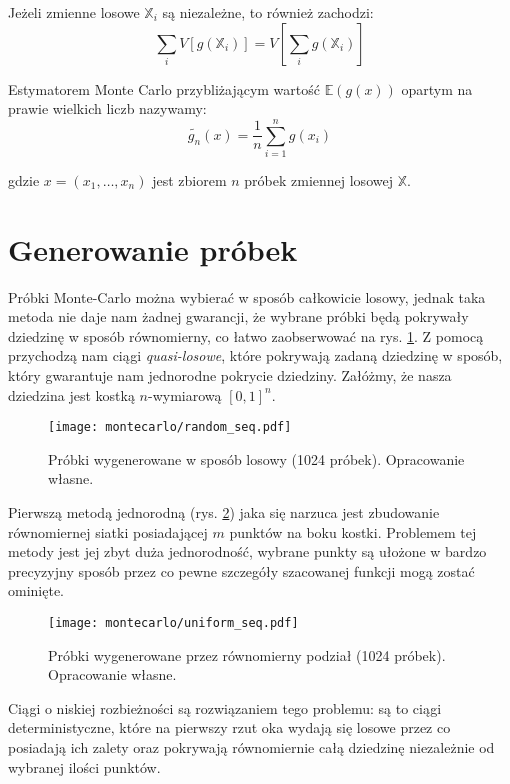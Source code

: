 \documentclass[../main.tex]{subfiles}
\begin{document}
Jeżeli zmienne losowe $\mathbb{X}_i$ są niezależne, to również zachodzi:
\[
\sum_{i} V \left[
	g(\mathbb{X}_i)
\right]
=
V \left[
	\sum_{i} g(\mathbb{X}_i)
\right]
\]

Estymatorem Monte Carlo przybliżającym wartość $\mathbb{E}(g(x))$ opartym na prawie wielkich liczb nazywamy:
\[
\widetilde{g_n}(x) =
	\frac{1}{n}
	\sum_{i=1}^{n}g(x_i)
\]

\noindent gdzie $x=(x_1, \ldots, x_n)$ jest zbiorem $n$ próbek zmiennej losowej $\mathbb{X}$.

\section{Generowanie próbek}

Próbki Monte-Carlo można wybierać w sposób całkowicie losowy, jednak taka metoda nie daje nam żadnej gwarancji, że wybrane próbki będą pokrywały dziedzinę w sposób równomierny, co łatwo zaobserwować na rys. \ref{fig:RandomSamples}. Z pomocą przychodzą nam ciągi \textit{quasi-losowe}, które pokrywają zadaną dziedzinę w sposób, który gwarantuje nam jednorodne pokrycie dziedziny. Załóżmy, że nasza dziedzina jest kostką $n$-wymiarową $[0,1]^{n}$.

\begin{figure}[h]
  \centering
  \texttt{[image: montecarlo/random\_seq.pdf]}
  \caption{Próbki wygenerowane w sposób losowy (1024 próbek). Opracowanie własne.}
  \label{fig:RandomSamples}
\end{figure}

Pierwszą metodą jednorodną (rys. \ref{fig:UniformSamples}) jaka się narzuca jest zbudowanie równomiernej siatki posiadającej $m$ punktów na boku kostki. Problemem tej metody jest jej zbyt duża jednorodność, wybrane punkty są ułożone w bardzo precyzyjny sposób przez co pewne szczegóły szacowanej funkcji mogą zostać ominięte.

\begin{figure}[h]
  \centering
  \texttt{[image: montecarlo/uniform\_seq.pdf]}
  \caption{Próbki wygenerowane przez równomierny podział (1024 próbek). Opracowanie własne.}
  \label{fig:UniformSamples}
\end{figure}

Ciągi o niskiej rozbieżności są rozwiązaniem tego problemu: są to ciągi deterministyczne, które na pierwszy rzut oka wydają się losowe przez co posiadają ich zalety oraz pokrywają równomiernie całą dziedzinę niezależnie od wybranej ilości punktów.
\end{document}
